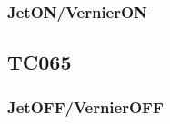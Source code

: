 \documentclass[12pt]{article}
\begin{document}
\subsubsection{JetON/VernierON}

\subsection{\textbf{TC065}}\label{sec:TC065}

\subsubsection{JetOFF/VernierOFF}
\end{document}
